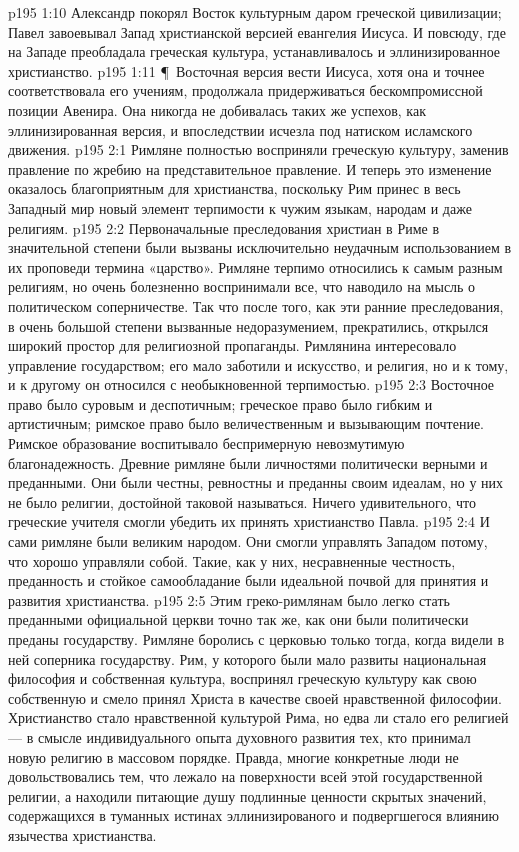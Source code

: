 \vs p195 1:10 Александр покорял Восток культурным даром греческой цивилизации; Павел завоевывал Запад христианской версией евангелия Иисуса. И повсюду, где на Западе преобладала греческая культура, устанавливалось и эллинизированное христианство.
\vs p195 1:11 \P\ Восточная версия вести Иисуса, хотя она и точнее соответствовала его учениям, продолжала придерживаться бескомпромиссной позиции Авенира. Она никогда не добивалась таких же успехов, как эллинизированная версия, и впоследствии исчезла под натиском исламского движения.
\vs p195 2:1 Римляне полностью восприняли греческую культуру, заменив правление по жребию на представительное правление. И теперь это изменение оказалось благоприятным для христианства, поскольку Рим принес в весь Западный мир новый элемент терпимости к чужим языкам, народам и даже религиям.
\vs p195 2:2 Первоначальные преследования христиан в Риме в значительной степени были вызваны исключительно неудачным использованием в их проповеди термина «царство». Римляне терпимо относились к самым разным религиям, но очень болезненно воспринимали все, что наводило на мысль о политическом соперничестве. Так что после того, как эти ранние преследования, в очень большой степени вызванные недоразумением, прекратились, открылся широкий простор для религиозной пропаганды. Римлянина интересовало управление государством; его мало заботили и искусство, и религия, но и к тому, и к другому он относился с необыкновенной терпимостью.
\vs p195 2:3 Восточное право было суровым и деспотичным; греческое право было гибким и артистичным; римское право было величественным и вызывающим почтение. Римское образование воспитывало беспримерную невозмутимую благонадежность. Древние римляне были личностями политически верными и преданными. Они были честны, ревностны и преданны своим идеалам, но у них не было религии, достойной таковой называться. Ничего удивительного, что греческие учителя смогли убедить их принять христианство Павла.
\vs p195 2:4 И сами римляне были великим народом. Они смогли управлять Западом потому, что хорошо управляли собой. Такие, как у них, несравненные честность, преданность и стойкое самообладание были идеальной почвой для принятия и развития христианства.
\vs p195 2:5 Этим греко\hyp{}римлянам было легко стать преданными официальной церкви точно так же, как они были политически преданы государству. Римляне боролись с церковью только тогда, когда видели в ней соперника государству. Рим, у которого были мало развиты национальная философия и собственная культура, воспринял греческую культуру как свою собственную и смело принял Христа в качестве своей нравственной философии. Христианство стало нравственной культурой Рима, но едва ли стало его религией --- в смысле индивидуального опыта духовного развития тех, кто принимал новую религию в массовом порядке. Правда, многие конкретные люди не довольствовались тем, что лежало на поверхности всей этой государственной религии, а находили питающие душу подлинные ценности скрытых значений, содержащихся в туманных истинах эллинизированого и подвергшегося влиянию язычества христианства.
